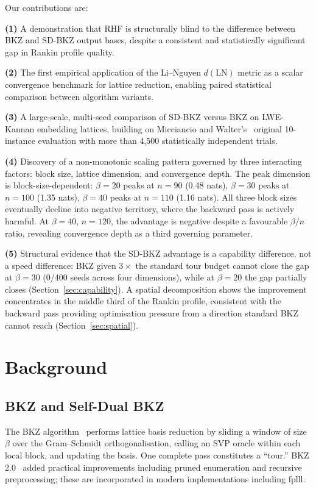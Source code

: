 \documentclass[journal=cic,version=preprint]{iacrj}
\begin{document}
Our contributions are:

\textbf{(1)} A demonstration that RHF is structurally blind to the difference between BKZ and SD-BKZ output bases, despite a consistent and statistically significant gap in Rankin profile quality.

\textbf{(2)} The first empirical application of the Li--Nguyen $d(\mathrm{LN})$ metric as a scalar convergence benchmark for lattice reduction, enabling paired statistical comparison between algorithm variants.

\textbf{(3)} A large-scale, multi-seed comparison of SD-BKZ versus BKZ on LWE-Kannan embedding lattices, building on Micciancio and Walter's~\cite{EC:MicWal16} original 10-instance evaluation with more than 4{,}500 statistically independent trials.

\textbf{(4)} Discovery of a non-monotonic scaling pattern governed by three interacting factors: block size, lattice dimension, and convergence depth. The peak dimension is block-size-dependent: $\beta=20$ peaks at $n=90$ (0.48 nats), $\beta=30$ peaks at $n=100$ (1.35 nats), $\beta=40$ peaks at $n=110$ (1.16 nats). All three block sizes eventually decline into negative territory, where the backward pass is actively harmful. At $\beta=40$, $n=120$, the advantage is negative despite a favourable $\beta/n$ ratio, revealing convergence depth as a third governing parameter.

\textbf{(5)} Structural evidence that the SD-BKZ advantage is a capability difference, not a speed difference: BKZ given $3\times$ the standard tour budget cannot close the gap at $\beta=30$ (0/400 seeds across four dimensions), while at $\beta=20$ the gap partially closes (Section~\ref{sec:capability}). A spatial decomposition shows the improvement concentrates in the middle third of the Rankin profile, consistent with the backward pass providing optimisation pressure from a direction standard BKZ cannot reach (Section~\ref{sec:spatial}).

\section{Background}
\label{sec:background}

\subsection{BKZ and Self-Dual BKZ}

The BKZ algorithm~\cite{MathProg:SchEuc94} performs lattice basis reduction by sliding a window of size $\beta$ over the Gram--Schmidt orthogonalisation, calling an SVP oracle within each local block, and updating the basis. One complete pass constitutes a ``tour.'' BKZ 2.0~\cite{AC:CheNgu11} added practical improvements including pruned enumeration and recursive preprocessing; these are incorporated in modern implementations including fplll.
\end{document}
